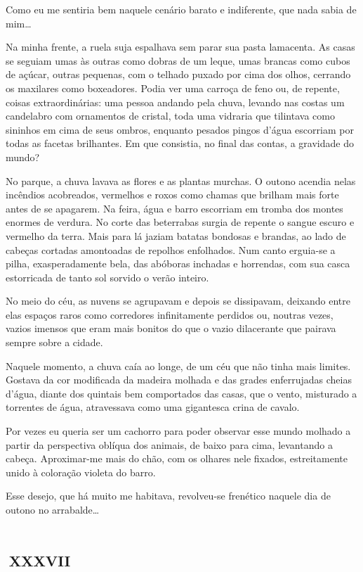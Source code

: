 Como eu me sentiria bem naquele cenário barato e indiferente, que nada sabia de mim\ldots{}

Na minha frente, a ruela suja espalhava sem parar sua pasta lamacenta. As casas se seguiam umas às outras como dobras de um leque, umas brancas como cubos de açúcar, outras pequenas, com o telhado puxado por cima dos olhos, cerrando os maxilares como boxeadores. Podia ver uma carroça de feno ou, de repente, coisas extraordinárias: uma pessoa andando pela chuva, levando nas costas um candelabro com ornamentos de cristal, toda uma vidraria que tilintava como sininhos em cima de seus ombros, enquanto pesados pingos d'água escorriam por todas as facetas brilhantes. Em que consistia, no final das contas, a gravidade do mundo?

No parque, a chuva lavava as flores e as plantas murchas. O outono acendia nelas incêndios acobreados, vermelhos e roxos como chamas que brilham mais forte antes de se apagarem. Na feira, água e barro escorriam em tromba dos montes enormes de verdura. No corte das beterrabas surgia de repente o sangue escuro e vermelho da terra. Mais para lá jaziam batatas bondosas e brandas, ao lado de cabeças cortadas amontoadas de repolhos enfolhados. Num canto erguia-se a pilha, exasperadamente bela, das abóboras inchadas e horrendas, com sua casca estorricada de tanto sol sorvido o verão inteiro.

No meio do céu, as nuvens se agrupavam e depois se dissipavam, deixando entre elas espaços raros como corredores infinitamente perdidos ou, noutras vezes, vazios imensos que eram mais bonitos do que o vazio dilacerante que pairava sempre sobre a cidade.

Naquele momento, a chuva caía ao longe, de um céu que não tinha mais limites. Gostava da cor modificada da madeira molhada e das grades enferrujadas cheias d'água, diante dos quintais bem comportados das casas, que o vento, misturado a torrentes de água, atravessava como uma gigantesca crina de cavalo.

Por vezes eu queria ser um cachorro para poder observar esse mundo molhado a partir da perspectiva oblíqua dos animais, de baixo para cima, levantando a cabeça. Aproximar-me mais do chão, com os olhares nele fixados, estreitamente unido à coloração violeta do barro.

Esse desejo, que há muito me habitava, revolveu-se frenético naquele dia de outono no arrabalde\ldots{}


\chapter*{\small{}\,\Large\centering\textsc{xxxvii}\,\small{}}


